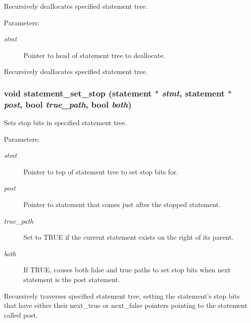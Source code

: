 Recursively deallocates specified statement tree.

\begin{Desc}
\item[Parameters:]
\begin{description}
\item[{\em stmt}]Pointer to head of statement tree to deallocate.\end{description}
\end{Desc}
Recursively deallocates specified statement tree. 
\subsubsection{\setlength{\rightskip}{0pt plus 5cm}void statement\_\-set\_\-stop ({\bf statement} $\ast$ {\em stmt}, {\bf statement} $\ast$ {\em post}, {\bf bool} {\em true\_\-path}, {\bf bool} {\em both})}\label{statement_8h_a4}


Sets stop bits in specified statement tree.

\begin{Desc}
\item[Parameters:]
\begin{description}
\item[{\em stmt}]Pointer to top of statement tree to set stop bits for. \item[{\em post}]Pointer to statement that comes just after the stopped statement. \item[{\em true\_\-path}]Set to TRUE if the current statement exists on the right of its parent. \item[{\em both}]If TRUE, causes both false and true paths to set stop bits when next statement is the post statement.\end{description}
\end{Desc}
Recursively traverses specified statement tree, setting the statement's stop bits that have either their next\_\-true or next\_\-false pointers pointing to the statement called post. 